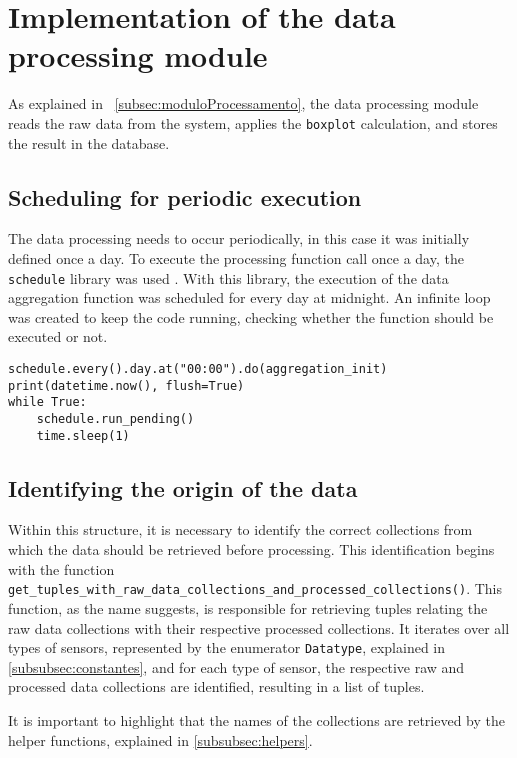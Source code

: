 \section[Implementation of the data processing module]{Implementation of the data processing module}\label{sec:ImplModuloProcessamento}

As explained in ~\ref{subsec:moduloProcessamento}, the data processing module reads the raw data from the system, applies the \texttt{boxplot} calculation, and stores the result in the database.

\subsection{Scheduling for periodic execution}
The data processing needs to occur periodically, in this case it was initially defined once a day. To execute the processing function call once a day, the \texttt{schedule} library was used \cite{scheduleDocs}. With this library, the execution of the data aggregation function was scheduled for every day at midnight. An infinite loop was created to keep the code running, checking whether the function should be executed or not.

\begin{Verbatim}[fontsize=\small, baselinestretch=0.8]
schedule.every().day.at("00:00").do(aggregation_init)
print(datetime.now(), flush=True)
while True:
    schedule.run_pending()
    time.sleep(1)
\end{Verbatim}

\subsection{Identifying the origin of the data}
Within this structure, it is necessary to identify the correct collections from which the data should be retrieved before processing. This identification begins with the function \texttt{get\_tuples\_with\_raw\_data\_collections\_and\_processed\_collections()}. This function, as the name suggests, is responsible for retrieving tuples relating the raw data collections with their respective processed collections. It iterates over all types of sensors, represented by the enumerator \texttt{Datatype}, explained in \ref{subsubsec:constantes}, and for each type of sensor, the respective raw and processed data collections are identified, resulting in a list of tuples.

It is important to highlight that the names of the collections are retrieved by the helper functions, explained in \ref{subsubsec:helpers}.

